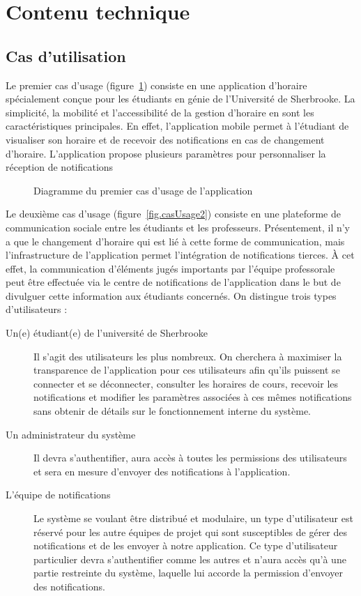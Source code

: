 \section{Contenu technique}
    \subsection{Cas d'utilisation}
    Le premier cas d'usage (figure~\ref{fig.casUsage1}) consiste en une application d'horaire spécialement conçue pour les étudiants en génie de l'Université de Sherbrooke. La simplicité, la mobilité et l'accessibilité de la gestion d'horaire en sont les caractéristiques principales. En effet, l'application mobile permet à l'étudiant de visualiser son horaire et de recevoir des notifications en cas de changement d'horaire. L'application propose plusieurs paramètres pour personnaliser la réception de notifications
    
    \begin{figure}[p] \centering
        
        \caption{Diagramme du premier cas d'usage de l'application}
        \label{fig.casUsage1}
    \end{figure}

    Le deuxième cas d'usage (figure~\ref{fig.casUsage2}) consiste en une plateforme de communication sociale entre les étudiants et les professeurs. Présentement, il n'y a que le changement d'horaire qui est lié à cette forme de communication, mais l'infrastructure de l'application permet l'intégration de notifications tierces. À cet effet, la communication d'éléments jugés importants par l'équipe professorale peut être effectuée via le centre de notifications de l'application dans le but de divulguer cette information aux étudiants concernés. On distingue trois types d'utilisateurs :
    \begin{description}
        \item[Un(e) étudiant(e) de l'université de Sherbrooke] Il s'agit des utilisateurs les plus nombreux. On cherchera à maximiser la transparence de l'application pour ces utilisateurs afin qu'ils puissent se connecter et se déconnecter, consulter les horaires de cours, recevoir les notifications et modifier les paramètres associées à ces mêmes notifications sans obtenir de détails sur le fonctionnement interne du système.
        \item[Un administrateur du système] Il devra s'authentifier, aura accès à toutes les permissions des utilisateurs et sera en mesure d'envoyer des notifications à l'application.
        \item[L'équipe de notifications] Le système se voulant être distribué et modulaire, un type d'utilisateur est réservé pour les autre équipes de projet qui sont susceptibles de gérer des notifications et de les envoyer à notre application. Ce type d'utilisateur particulier devra s'authentifier comme les autres et n'aura accès qu'à une partie restreinte du système, laquelle lui accorde la permission d'envoyer des notifications.
    \end{description}
        
